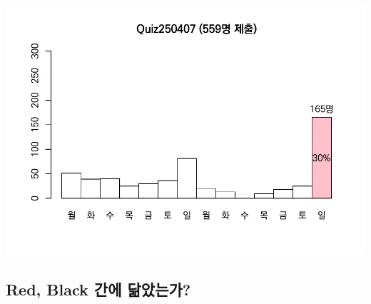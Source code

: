 \documentclass[
]{book}
\begin{document}
\includegraphics{Quiz_report_2025_files/figure-latex/unnamed-chunk-165-1.pdf}

\subsection{Red, Black 간에 닮았는가?}\label{red-black-uxac04uxc5d0-uxb2eeuxc558uxb294uxac00-5}
\end{document}
